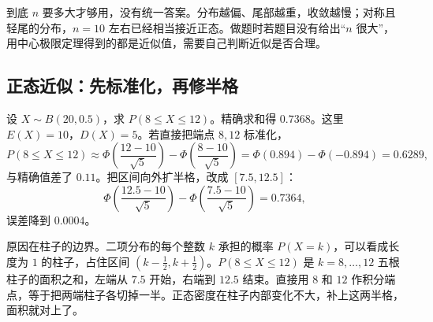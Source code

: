 到底 $n$ 要多大才够用，没有统一答案。分布越偏、尾部越重，收敛越慢；对称且轻尾的分布，$n=10$ 左右已经相当接近正态。做题时若题目没有给出“$n$ 很大”，用中心极限定理得到的都是近似值，需要自己判断近似是否合理。

\subsection{正态近似：先标准化，再修半格}

设 $X\sim B(20,0.5)$，求 $P(8\le X\le12)$。精确求和得 $0.7368$。这里 $E(X)=10$，$D(X)=5$。若直接把端点 $8,12$ 标准化，
\[
P(8\le X\le12)
\approx\Phi\!\left(\frac{12-10}{\sqrt5}\right)-\Phi\!\left(\frac{8-10}{\sqrt5}\right)
=\Phi(0.894)-\Phi(-0.894)=0.6289,
\]
与精确值差了 $0.11$。把区间向外扩半格，改成 $[7.5,12.5]$：
\[
\Phi\!\left(\frac{12.5-10}{\sqrt5}\right)-\Phi\!\left(\frac{7.5-10}{\sqrt5}\right)
=0.7364,
\]
误差降到 $0.0004$。

原因在柱子的边界。二项分布的每个整数 $k$ 承担的概率 $P(X=k)$，可以看成长度为 $1$ 的柱子，占住区间 $(k-\frac12,k+\frac12)$。$P(8\le X\le12)$ 是 $k=8,\dots,12$ 五根柱子的面积之和，左端从 $7.5$ 开始，右端到 $12.5$ 结束。直接用 $8$ 和 $12$ 作积分端点，等于把两端柱子各切掉一半。正态密度在柱子内部变化不大，补上这两半格，面积就对上了。

